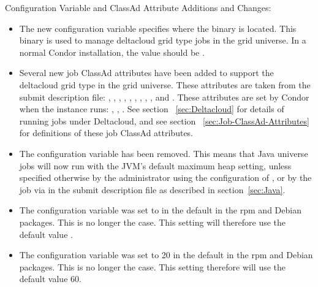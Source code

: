 \noindent Configuration Variable and ClassAd Attribute Additions and Changes:

\begin{itemize}

\item The new configuration variable  specifies
where the  binary is located. This binary is used to
manage deltacloud grid type jobs in the grid universe.
In a normal Condor installation, the value should be
.

\item Several new job ClassAd attributes have been added to support
the deltacloud grid type in the grid universe.
These attributes are taken from the submit description file:
,
,
,
,
,
,
,
,
, and
.
These attributes are set by Condor when the instance runs:
,
,
.
See section ~\ref{sec:Deltacloud} for details of running jobs under
Deltacloud, and see section ~\ref{sec:Job-ClassAd-Attributes}
for definitions of these job ClassAd attributes.

\item The configuration variable  
  has been removed. 
  This means that Java universe jobs will now run with the JVM's 
  default maximum heap setting,
  unless specified otherwise by the administrator using the configuration
  of ,
  or by the job via 
   in the submit description file
  as described in section~\ref{sec:Java}.

\item The configuration variable 
  was set to  in the default 
  in the rpm and Debian packages.  This is no longer the case.
  This setting will therefore use the default value .

\item The configuration variable  was set
  to 20 in the default  in the rpm and
  Debian packages.  This is no longer the case.  This setting
  therefore will use the default value 60.

\end{itemize}

